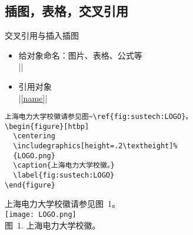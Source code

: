     \subsection{插图，表格，交叉引用}
    \begin{frame}[fragile]{交叉引用与插入插图}
        \begin{itemize}
        \item 给对象命名：图片、表格、公式等\\
        |\label{name}|
      \item 引用对象\\
        |\ref{name}|
        \end{itemize}
      \bigskip
      
        \begin{minipage}{0.7\linewidth}
          \lstset{language=[LaTeX]TeX}
          \begin{lstlisting}
上海电力大学校徽请参见图~\ref{fig:sustech:LOGO}。
\begin{figure}[htbp]
  \centering
  \includegraphics[height=.2\textheight]%
  {LOGO.png}
  \caption{上海电力大学校徽。}
  \label{fig:sustech:LOGO}
\end{figure}
      \end{lstlisting}
        \end{minipage}\hfill
        \begin{minipage}{0.3\linewidth}\centering
          {\songti 上海电力大学校徽请参见图~1。}\\[1em]
       \texttt{[image: LOGO.png]}\\
       {\footnotesize\heiti 图~1. 上海电力大学校徽。}
        \end{minipage}
      \end{frame}
      
